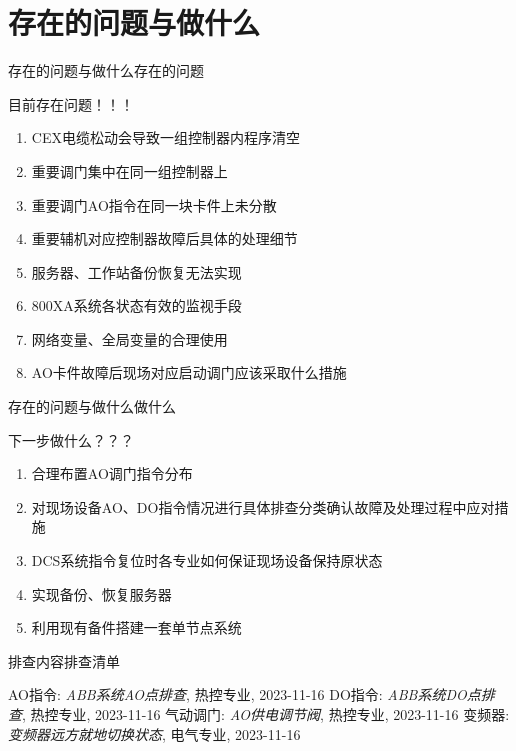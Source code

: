 \documentclass[12pt,hyperref={CJKbookmarks=true}]{beamer} %
\begin{document}
\section{存在的问题与做什么}
\begin{frame}{存在的问题与做什么}{存在的问题}
\begin{alertblock}{\heiti 目前存在问题！！！}
			\begin{enumerate}
				\item  CEX电缆松动会导致一组控制器内程序清空
\item  重要调门集中在同一组控制器上
\item  重要调门AO指令在同一块卡件上未分散
				\item  重要辅机对应控制器故障后具体的处理细节
\item  服务器、工作站备份恢复无法实现
				
				\item  800XA系统各状态有效的监视手段

				\item  网络变量、全局变量的合理使用

				
\item  AO卡件故障后现场对应启动调门应该采取什么措施
		\end{enumerate}
		\end{alertblock}
\end{frame}
\begin{frame}{存在的问题与做什么}{做什么}
\begin{alertblock}{\heiti 下一步做什么？？？}
			\begin{enumerate}
				\item  合理布置AO调门指令分布
				\item   对现场设备AO、DO指令情况进行具体排查分类确认故障及处理过程中应对措施
\item   DCS系统指令复位时各专业如何保证现场设备保持原状态
				\item   实现备份、恢复服务器
				\item   利用现有备件搭建一套单节点系统


		\end{enumerate}
		\end{alertblock}
\end{frame}


	
	

	
\begin{frame}{排查内容}{排查清单}  
 \begin{thebibliography}{99}

 AO指令: \emph{ABB系统AO点排查},
热控专业, 2023-11-16
 DO指令: \emph{ABB系统DO点排查},
热控专业, 2023-11-16
 气动调门: \emph{AO供电调节阀},
热控专业, 2023-11-16
 变频器: \emph{变频器远方就地切换状态},
电气专业, 2023-11-16
\end{thebibliography}
\end{frame}
\end{document}
